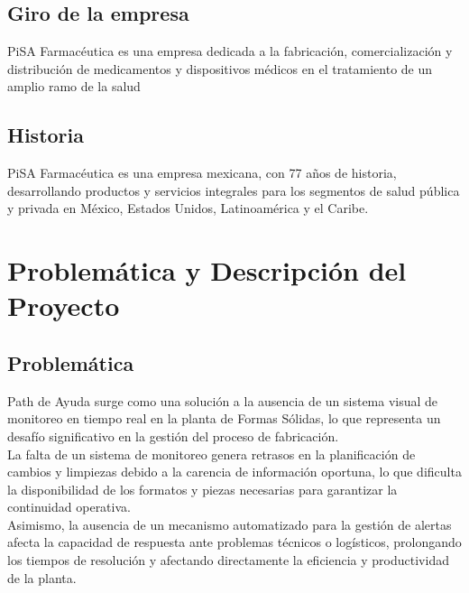 \documentclass[12pt,letterpaper,spanish, xcolor=table]{report}
\begin{document}
\section{Giro de la empresa}

PiSA Farmacéutica es una empresa dedicada a la fabricación, comercialización y distribución de medicamentos y dispositivos médicos en el tratamiento de un amplio ramo de la salud

\section{Historia}

PiSA Farmacéutica es una empresa mexicana, con 77 años de historia, desarrollando productos y servicios integrales para los segmentos de salud pública y privada en México, Estados Unidos, Latinoamérica y el Caribe.

\newpage
	
\chapter{Problemática y Descripción del Proyecto}
\newpage

\section{Problemática}

	Path de Ayuda surge como una solución a la ausencia de un sistema visual de monitoreo en tiempo real en la planta de Formas Sólidas, lo que representa un desafío significativo en la gestión del proceso de fabricación.\\
	
	La falta de un sistema de monitoreo genera retrasos en la planificación de cambios y limpiezas debido a la carencia de información oportuna, lo que dificulta la disponibilidad de los formatos y piezas necesarias para garantizar la continuidad operativa.\\

	Asimismo, la ausencia de un mecanismo automatizado para la gestión de alertas afecta la capacidad de respuesta ante problemas técnicos o logísticos, prolongando los tiempos de resolución y afectando directamente la eficiencia y productividad de la planta.
\end{document}
